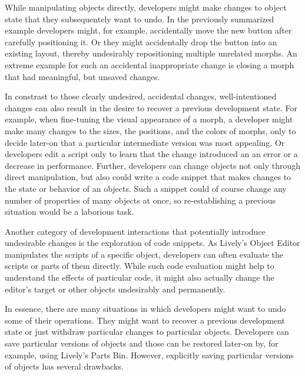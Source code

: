 While manipulating objects directly, developers might make changes to object state that they subsequentely want to undo.
In the previously summarized example developers might, for example, accidentally move the new button after carefully positioning it.
Or they might accidentally drop the button into an existing layout, thereby undesirably repositioning multiple unrelated morphs.
An extreme example for such an accidental inappropriate change is closing a morph that had meaningful, but unsaved changes.

In constrast to those clearly undesired, accidental changes, well-intentioned changes can also result in the desire to recover a previous development state.
For example, when fine-tuning the visual appearance of a morph, a developer might make many changes to the sizes, the positions, and the colors of morphs, only to decide later-on that a particular intermediate version was most appealing.
Or developers edit a script only to learn that the change introduced an an error or a decrease in performance.
Further, developers can change objects not only through direct manipulation, but also could write a code snippet that makes changes to the state or behavior of an objects.
Such a snippet could of course change any number of properties of many objects at once, so re-establishing a previous situation would be a laborious task.

Another category of development interactions that potentially introduce undesirable changes is the exploration of code snippets.
As Lively's Object Editor manipulates the scripts of a specific object, developers can often evaluate the scripts or parts of them directly.
While such code evaluation might help to understand the effects of particular code, it might also actually change the editor's target or other objects undesirably and permanently.

In essence, there are many situations in which developers might want to undo some of their operations.
They might want to recover a previous development state or just withdraw particular changes to particular objects.
Developers can save particular versions of objects and those can be restored later-on by, for example, using Lively's Parts Bin.
However, explicitly saving particular versions of objects has several drawbacks.




